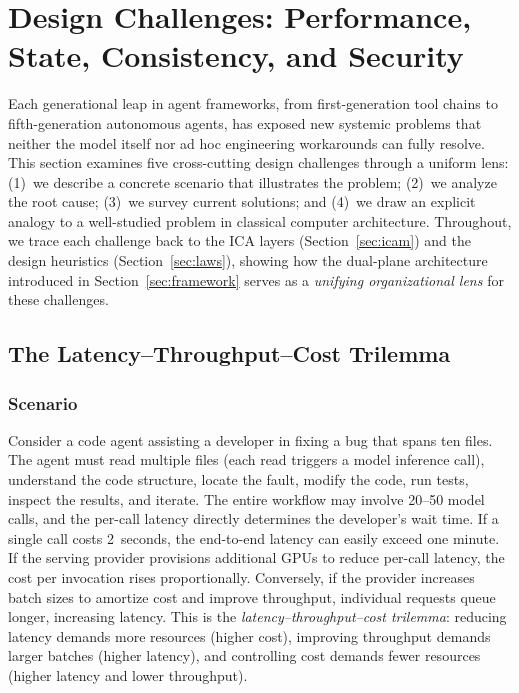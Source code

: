 \section{Design Challenges: Performance, State, Consistency, and Security}
\label{sec:challenges}

Each generational leap in agent frameworks, from first-generation tool chains to fifth-generation autonomous agents, has exposed new systemic problems that neither the model itself nor ad hoc engineering workarounds can fully resolve.
This section examines five cross-cutting design challenges through a uniform lens: (1)~we describe a concrete scenario that illustrates the problem; (2)~we analyze the root cause; (3)~we survey current solutions; and (4)~we draw an explicit analogy to a well-studied problem in classical computer architecture.
Throughout, we trace each challenge back to the ICA layers (Section~\ref{sec:icam}) and the design heuristics (Section~\ref{sec:laws}), showing how the dual-plane architecture introduced in Section~\ref{sec:framework} serves as a \emph{unifying organizational lens} for these challenges.


\subsection{The Latency--Throughput--Cost Trilemma}

\subsubsection{Scenario}
Consider a code agent assisting a developer in fixing a bug that spans ten files.
The agent must read multiple files (each read triggers a model inference call), understand the code structure, locate the fault, modify the code, run tests, inspect the results, and iterate.
The entire workflow may involve 20--50 model calls, and the per-call latency directly determines the developer's wait time.
If a single call costs 2~seconds, the end-to-end latency can easily exceed one minute.
If the serving provider provisions additional GPUs to reduce per-call latency, the cost per invocation rises proportionally.
Conversely, if the provider increases batch sizes to amortize cost and improve throughput, individual requests queue longer, increasing latency.
This is the \emph{latency--throughput--cost trilemma}: reducing latency demands more resources (higher cost), improving throughput demands larger batches (higher latency), and controlling cost demands fewer resources (higher latency and lower throughput).

